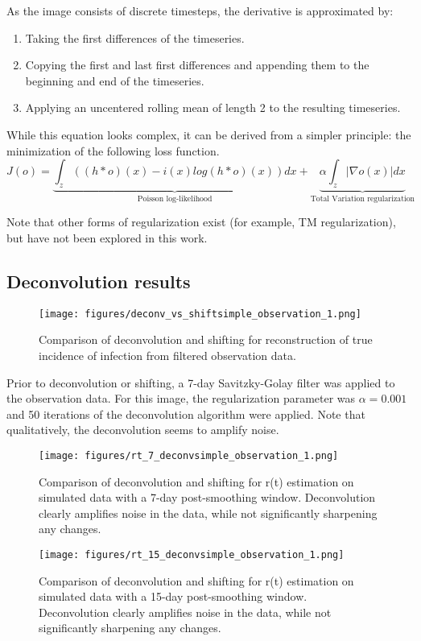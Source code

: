 \documentclass{article}
\begin{document}
As the image consists of discrete timesteps, the derivative is approximated by:
\begin{enumerate}
	\item Taking the first differences of the timeseries.
	\item Copying the first and last first differences and appending them to the beginning and end of the timeseries.
	\item Applying an uncentered rolling mean of length 2 to the resulting timeseries.
\end{enumerate}

While this equation looks complex, it can be derived from a simpler principle: the minimization of the following loss function. 
\begin{equation}
    J(o) = \underbrace{\int_z ((h*o)(x) - i(x) log(h*o)(x))dx}_{\mbox{Poisson log-likelihood}} + \underbrace{\alpha \int_z |\nabla o(x)| dx}_{\mbox{Total Variation regularization}}
\end{equation}

Note that other forms of regularization exist (for example, TM regularization), but have not been explored in this work.

\subsection{Deconvolution results}
\begin{figure}[h!]
\centering
\texttt{[image: figures/deconv\_vs\_shiftsimple\_observation\_1.png]}
\caption{Comparison of deconvolution and shifting for reconstruction of true incidence of infection from filtered observation data.}
\end{figure}
Prior to deconvolution or shifting, a 7-day Savitzky-Golay filter was applied to the observation data. For this image, the regularization parameter was $\alpha = 0.001$ and 50 iterations of the deconvolution algorithm were applied. Note that qualitatively, the deconvolution seems to amplify noise.

\clearpage
\begin{figure}[h!]
\centering
\texttt{[image: figures/rt\_7\_deconvsimple\_observation\_1.png]}
\caption{Comparison of deconvolution and shifting for r(t) estimation on simulated data with a 7-day post-smoothing window. Deconvolution clearly amplifies noise in the data, while not significantly sharpening any changes.}
\end{figure}

\begin{figure}[h!]
\centering
\texttt{[image: figures/rt\_15\_deconvsimple\_observation\_1.png]}
\caption{Comparison of deconvolution and shifting for r(t) estimation on simulated data with a 15-day post-smoothing window. Deconvolution clearly amplifies noise in the data, while not significantly sharpening any changes.}
\end{figure}
\end{document}
